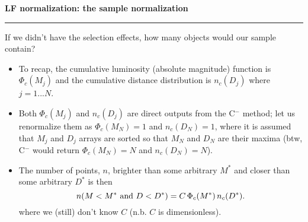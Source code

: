\documentclass[letterpaper,landscape]{slides}
\begin{document}
\begin{slide}
\begin{center}
\bfseries
{\large {\color{red} LF normalization: the sample normalization}}
\end{center}
\vskip 0.2in
\hrule
{\color{blue} If we didn't have the selection effects, how many 
  objects would our sample contain?} 
\begin{itemize}
\item  To recap, the cumulative luminosity (absolute magnitude) function is 
$\Phi_c(M_j)$ and the cumulative distance distribution is $n_c(D_j)$ where
$j=1...N$.
\item Both $\Phi_c(M_j)$ and $n_c(D_j)$ are  {\color{blue} direct outputs} from the C$^-$ method;
{\color{blue} let us renormalize them} as $\Phi_c(M_N)=1$ and  $n_c(D_N)=1$,
where it is assumed that $M_j$ and $D_j$ arrays are sorted so that $M_N$ and 
$D_N$ are their maxima (btw, C$^-$ would return $\Phi_c(M_N)=N$ and  $n_c(D_N)=N$). 
\item The number of points, $n$,  brighter than some arbitrary $M^\ast$ and closer than
some arbitrary $D^\ast$ is then
\begin{equation}
          n(M<M^\ast \,\, {\rm and} \,\,  D<D^\ast)= C \, \Phi_c(M^\ast) \, n_c(D^\ast).
\end{equation}
where we (still) don't know $C$ (n.b. $C$ is dimensionless). 
\end{itemize}

\vfill
\end{slide}
 
\end{document}
